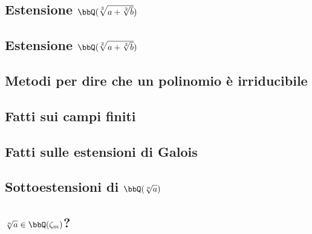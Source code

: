 \documentclass[a4paper,NoNotes,GeneralMath]{stdmdoc}
\begin{document}
	\subsection{Estensione $\bbQ(\sqrt[3]{a + \sqrt[2]{b}})$}
	
	\subsection{Estensione $\bbQ(\sqrt[2]{a + \sqrt[2]{b}})$}
	
	\subsection{Metodi per dire che un polinomio è irriducibile}
	
	\subsection{Fatti sui campi finiti}
	
	\subsection{Fatti sulle estensioni di Galois}
	
	\subsection{Sottoestensioni di $\bbQ(\sqrt[n]{a})$}
	
	\subsection{$\sqrt[n]{a} \in \bbQ(\zeta_m)$?}
\end{document}
